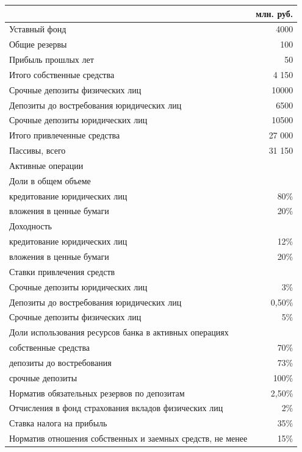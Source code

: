 \documentclass[12pt, table, a4paper,twoside]{exam}
\begin{document}
\begin{questions}
\begin{tabularx}{\linewidth}[b]{@{}>{\raggedright\arraybackslash}Xr@{}}	
	&млн. руб. \\
	\midrule
	Уставный фонд & 4000 \\
	Общие резервы & 100 \\
	Прибыль прошлых лет & 50 \\
	Итого собственные средства & 4 150 \\
	Срочные депозиты физических лиц & 10000 \\
	Депозиты до востребования юридических лиц & 6500 \\
	Срочные депозиты юридических лиц & 10500 \\
	Итого привлеченные средства & 27 000 \\
	\midrule
	Пассивы, всего & 31 150 \\
	\midrule
	Активные операции &  \\
	\midrule
	Доли в общем объеме &  \\
	кредитование юридических лиц & 80\% \\
	вложения в ценные бумаги & 20\% \\
	\midrule
	Доходность &  \\
	кредитование юридических лиц & 12\% \\
	вложения в ценные бумаги & 20\% \\
	\midrule
	Ставки привлечения средств &  \\
	Срочные депозиты юридических лиц & 3\% \\
	Депозиты до востребования юридических лиц & 0,50\% \\
	Срочные депозиты физических лиц & 5\% \\
	\midrule
	Доли использования ресурсов банка в активных операциях &  \\
	собственные средства & 70\% \\
	депозиты до востребования & 73\% \\
	срочные депозиты & 100\% \\
	\midrule
	Норматив обязательных резервов по депозитам & 2,50\% \\
	Отчисления в фонд страхования вкладов физических лиц & 2\% \\
	Ставка налога на прибыль & 35\% \\
	Норматив отношения собственных и заемных средств, не менее & 15\% \\	
	\bottomrule
\end{tabularx}%
\noaddpoints


\end{questions}
\end{document}
